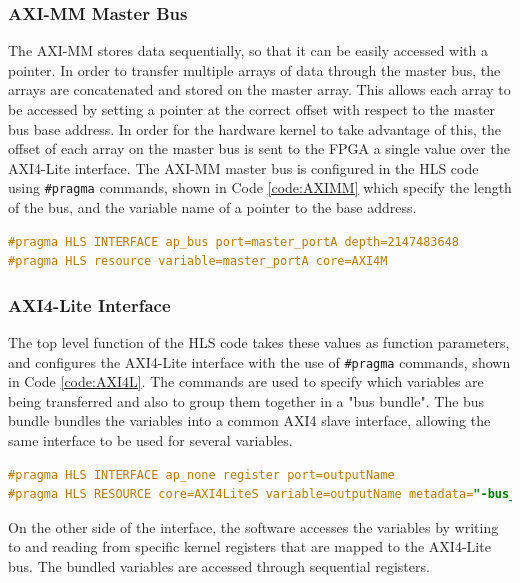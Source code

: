 \documentclass[12pt]{article}
\begin{document}
\subsubsection{AXI-MM Master Bus}
\label{sec:Design-PSnPL-AXIMM}

The AXI-MM stores data sequentially, so that it can be easily accessed with a pointer. In order to transfer multiple arrays of data through the master bus, the arrays are concatenated and stored on the master array. This allows each array to be accessed by setting a pointer at the correct offset with respect to the master bus base address. In order for the hardware kernel to take advantage of this, the offset of each array on the master bus is sent to the FPGA a single value over the AXI4-Lite interface. The AXI-MM master bus is configured in the HLS code using \lstinline|#pragma| commands, shown in Code \ref{code:AXIMM} which specify the length of the bus, and the variable name of a pointer to the base address.

\begin{lstlisting}[caption=Commands to configure AXI-MM master bus, label=code:AXIMM, language=C,deletekeywords={register}]
#pragma HLS INTERFACE ap_bus port=master_portA depth=2147483648
#pragma HLS resource variable=master_portA core=AXI4M
\end{lstlisting}


\subsubsection{AXI4-Lite Interface}
\label{sec:Design-PSnPL-AXI4L}

The top level function of the HLS code takes these values as function parameters, and configures the AXI4-Lite interface with the use of \lstinline|#pragma| commands, shown in Code \ref{code:AXI4L}. The commands are used to specify which variables are being transferred and also to group them together in a "bus bundle". The bus bundle bundles the variables into a common AXI4 slave interface, allowing the same interface to be used for several variables. 

\begin{lstlisting}[caption=Commands to configure AXI4-Lite bus, label=code:AXI4L, language=C,deletekeywords={register}]
#pragma HLS INTERFACE ap_none register port=outputName
#pragma HLS RESOURCE core=AXI4LiteS variable=outputName metadata="-bus_bundle CONFIG_BUS"
\end{lstlisting}

On the other side of the interface, the software accesses the variables by writing to and reading from specific kernel registers that are mapped to the AXI4-Lite bus. The bundled variables are accessed through sequential registers.
\end{document}
